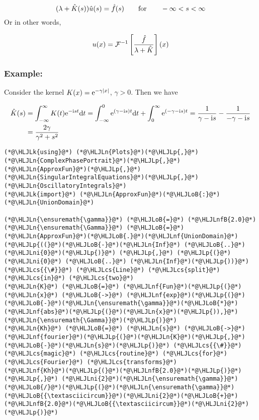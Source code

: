 \documentclass[12pt,a4paper]{article}
\newcommand{\HLJLk}[1]{\textcolor[RGB]{148,91,176}{\textbf{#1}}}
\newcommand{\HLJLn}[1]{#1}
\newcommand{\HLJLnf}[1]{\textcolor[RGB]{66,102,213}{#1}}
\newcommand{\HLJLnfB}[1]{\textcolor[RGB]{59,151,46}{#1}}
\newcommand{\HLJLni}[1]{\textcolor[RGB]{59,151,46}{#1}}
\newcommand{\HLJLoB}[1]{\textcolor[RGB]{102,102,102}{\textbf{#1}}}
\newcommand{\HLJLp}[1]{#1}
\newcommand{\HLJLcs}[1]{\textcolor[RGB]{153,153,119}{\textit{#1}}}
\def\qqfor{\qquad\hbox{for}\qquad}
\def\D{ {\rm d} }
\def\I{ {\rm i} }
\def\E{ {\rm e} }
\def\dt{\D t}
\begin{document}
\[
(\lambda + \hat K(s)) \hat u(s) = \hat f(s) \qqfor -\infty < s < \infty
\]
Or in other words,

\[
u(x) = {\cal F}^{-1} \left[{\hat f \over \lambda + \hat K }\right](x)
\]
\subsubsection{Example:}
Consider the kernel $K(x) = \E^{-\gamma |x|}$, $\gamma > 0$. Then we have


\begin{align*}
\hat K(s) &= \int_{-\infty}^\infty K(t) \E^{-\I s t} \dt = \int_{-\infty}^0 \E^{( \gamma - \I s ) t} \dt  + \int_0^\infty \E^{(-\gamma - \I s ) t} = {1 \over  \gamma - \I s} - {1 \over -\gamma - \I s } \\
&= {2\gamma \over \gamma^2 + s^2}
\end{align*}

\begin{lstlisting}
(*@\HLJLk{using}@*) (*@\HLJLn{Plots}@*)(*@\HLJLp{,}@*) (*@\HLJLn{ComplexPhasePortrait}@*)(*@\HLJLp{,}@*) (*@\HLJLn{ApproxFun}@*)(*@\HLJLp{,}@*) (*@\HLJLn{SingularIntegralEquations}@*)(*@\HLJLp{,}@*) (*@\HLJLn{OscillatoryIntegrals}@*)
(*@\HLJLk{import}@*) (*@\HLJLn{ApproxFun}@*)(*@\HLJLoB{:}@*) (*@\HLJLn{UnionDomain}@*)

(*@\HLJLn{\ensuremath{\gamma}}@*) (*@\HLJLoB{=}@*) (*@\HLJLnfB{2.0}@*)
(*@\HLJLn{\ensuremath{\Gamma}}@*) (*@\HLJLoB{=}@*) (*@\HLJLn{ApproxFun}@*)(*@\HLJLoB{.}@*)(*@\HLJLnf{UnionDomain}@*)(*@\HLJLp{((}@*)(*@\HLJLoB{-}@*)(*@\HLJLn{Inf}@*) (*@\HLJLoB{..}@*) (*@\HLJLni{0}@*)(*@\HLJLp{)}@*) (*@\HLJLp{,}@*) (*@\HLJLp{(}@*)(*@\HLJLni{0}@*) (*@\HLJLoB{..}@*) (*@\HLJLn{Inf}@*)(*@\HLJLp{))}@*) (*@\HLJLcs{{\#}}@*) (*@\HLJLcs{Line}@*) (*@\HLJLcs{split}@*) (*@\HLJLcs{in}@*) (*@\HLJLcs{two}@*)
(*@\HLJLn{K}@*) (*@\HLJLoB{=}@*) (*@\HLJLnf{Fun}@*)(*@\HLJLp{(}@*)(*@\HLJLn{x}@*) (*@\HLJLoB{->}@*) (*@\HLJLnf{exp}@*)(*@\HLJLp{(}@*)(*@\HLJLoB{-}@*)(*@\HLJLn{\ensuremath{\gamma}}@*)(*@\HLJLoB{*}@*)(*@\HLJLnf{abs}@*)(*@\HLJLp{(}@*)(*@\HLJLn{x}@*)(*@\HLJLp{)),}@*) (*@\HLJLn{\ensuremath{\Gamma}}@*)(*@\HLJLp{)}@*)
(*@\HLJLn{Kh}@*) (*@\HLJLoB{=}@*) (*@\HLJLn{s}@*) (*@\HLJLoB{->}@*) (*@\HLJLnf{fourier}@*)(*@\HLJLp{(}@*)(*@\HLJLn{K}@*)(*@\HLJLp{,}@*) (*@\HLJLoB{-}@*)(*@\HLJLn{s}@*)(*@\HLJLp{)}@*) (*@\HLJLcs{{\#}}@*) (*@\HLJLcs{magic}@*) (*@\HLJLcs{routine}@*) (*@\HLJLcs{for}@*) (*@\HLJLcs{Fourier}@*) (*@\HLJLcs{transforms}@*)
(*@\HLJLnf{Kh}@*)(*@\HLJLp{(}@*)(*@\HLJLnfB{2.0}@*)(*@\HLJLp{)}@*) (*@\HLJLp{,}@*) (*@\HLJLni{2}@*)(*@\HLJLn{\ensuremath{\gamma}}@*)(*@\HLJLoB{/}@*)(*@\HLJLp{(}@*)(*@\HLJLn{\ensuremath{\gamma}}@*)(*@\HLJLoB{{\textasciicircum}}@*)(*@\HLJLni{2}@*)(*@\HLJLoB{+}@*)(*@\HLJLnfB{2.0}@*)(*@\HLJLoB{{\textasciicircum}}@*)(*@\HLJLni{2}@*)(*@\HLJLp{)}@*)
\end{lstlisting}
\end{document}

